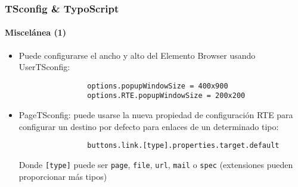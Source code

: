 \begin{frame}[fragile]
	\frametitle{TSconfig \& TypoScript}
	\framesubtitle{Miscelánea (1)}

	\begin{itemize}
		\item Puede configurarse el ancho y alto del Elemento Browser usando UserTSconfig:

			\begin{lstlisting}
				options.popupWindowSize = 400x900
				options.RTE.popupWindowSize = 200x200
			\end{lstlisting}


		\item PageTSconfig: puede usarse la nueva propiedad de configuración RTE para configurar un destino por defecto para enlaces de un determinado tipo:

			\begin{lstlisting}
				buttons.link.[type].properties.target.default
			\end{lstlisting}

			Donde \texttt{[type]} puede ser \texttt{page}, \texttt{file}, \texttt{url}, \texttt{mail} o \texttt{spec}\newline
			(extensiones pueden proporcionar más tipos)

	\end{itemize}

\end{frame}


